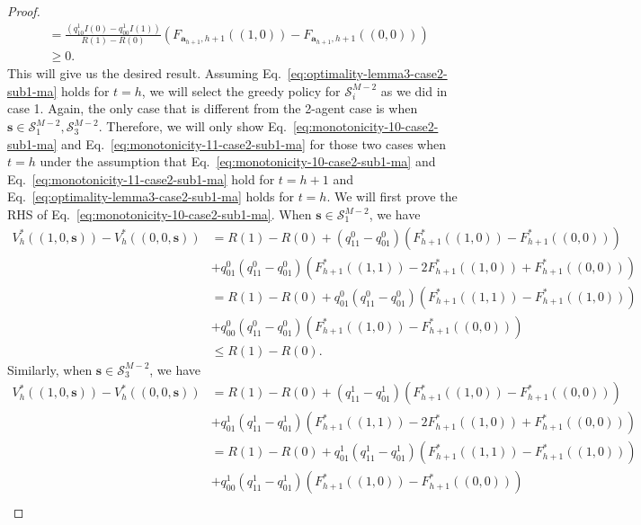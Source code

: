 \begin{proof}
\begin{align*}
    &=\frac{\left(q^1_{10}I(0)-q^1_{00}I(1)\right)}{R(1)-R(0)}\left(F_{\bm{a}_{h+1},h+1}\left((1,0)\right)-F_{\bm{a}_{h+1},h+1}\left((0,0)\right)\right)\\
    &\geq 0.
\end{align*}
This will give us the desired result. Assuming Eq.~\eqref{eq:optimality-lemma3-case2-sub1-ma} holds for $t=h$,
we will select the greedy policy for $\mathcal{S}_i^{M-2}$ as we did in case 1. Again, the only case that is different from the 2-agent case is when $\bm{s}\in\mathcal{S}_1^{M-2},\mathcal{S}_3^{M-2}$. Therefore, we will only show Eq.~\eqref{eq:monotonicity-10-case2-sub1-ma} and Eq.~\eqref{eq:monotonicity-11-case2-sub1-ma} for those two cases when $t=h$ under the assumption that Eq.~\eqref{eq:monotonicity-10-case2-sub1-ma} and Eq.~\eqref{eq:monotonicity-11-case2-sub1-ma} hold for $t=h+1$ and Eq.~\eqref{eq:optimality-lemma3-case2-sub1-ma} holds for $t=h$. We will first prove the RHS of Eq.~\eqref{eq:monotonicity-10-case2-sub1-ma}.
When $\bm{s}\in\mathcal{S}_1^{M-2}$, we have
\begin{align*}
    V_h^*\left((1,0,\bm{s})\right)-V_h^*\left((0,0,\bm{s})\right)&=R(1)-R(0)+\left(q^0_{11}-q^0_{01}\right)\left(F_{h+1}^*\left((1,0)\right)-F_{h+1}^*\left((0,0)\right)\right)\\
    &+q^0_{01}\left(q^0_{11}-q^0_{01}\right)\left(F_{h+1}^*\left((1,1)\right)-2F_{h+1}^*\left((1,0)\right)+F_{h+1}^*\left((0,0)\right)\right)\\
    &= R(1)-R(0)+q^0_{01}\left(q^0_{11}-q^0_{01}\right)\left(F_{h+1}^*\left((1,1)\right)-F_{h+1}^*\left((1,0)\right)\right)\\&+q^0_{00}\left(q^0_{11}-q^0_{01}\right)\left(F_{h+1}^*\left((1,0)\right)-F_{h+1}^*\left((0,0)\right)\right)\\
    &\leq R(1)-R(0).
\end{align*}
Similarly, when $\bm{s}\in\mathcal{S}_3^{M-2}$, we have
\begin{align*}
    V_h^*\left((1,0,\bm{s})\right)-V_h^*\left((0,0,\bm{s})\right)&=R(1)-R(0)+\left(q^1_{11}-q^1_{01}\right)\left(F_{h+1}^*\left((1,0)\right)-F_{h+1}^*\left((0,0)\right)\right)\\
    &+q^1_{01}\left(q^1_{11}-q^1_{01}\right)\left(F_{h+1}^*\left((1,1)\right)-2F_{h+1}^*\left((1,0)\right)+F_{h+1}^*\left((0,0)\right)\right)\\
    &= R(1)-R(0)+q^1_{01}\left(q^1_{11}-q^1_{01}\right)\left(F_{h+1}^*\left((1,1)\right)-F_{h+1}^*\left((1,0)\right)\right)\\&+q^1_{00}\left(q^1_{11}-q^1_{01}\right)\left(F_{h+1}^*\left((1,0)\right)-F_{h+1}^*\left((0,0)\right)\right)\\

\end{align*}
\end{proof}
